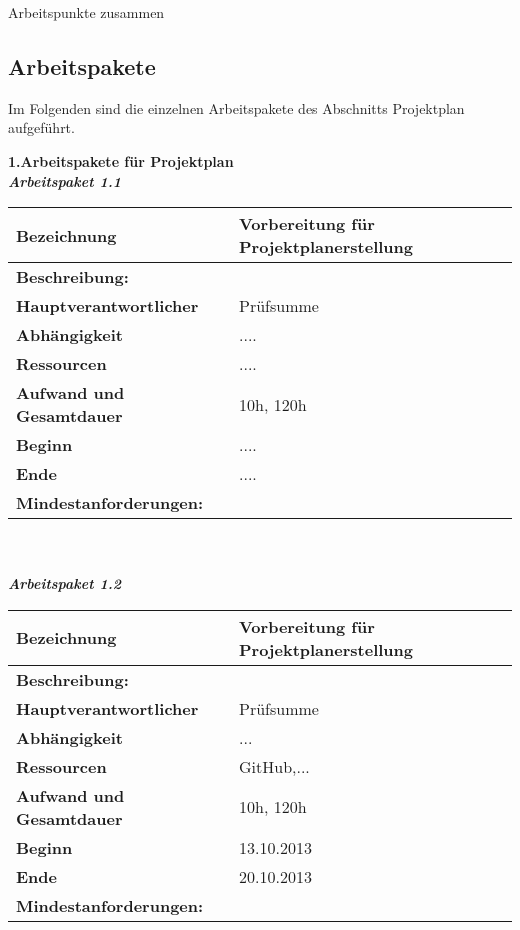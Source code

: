 \documentclass[fontsize=12pt,paper=a4,twoside]{scrartcl}
\begin{document}
Arbeitspunkte zusammen

\subsection{Arbeitspakete}\label{aps}

Im Folgenden sind die einzelnen Arbeitspakete des Abschnitts Projektplan aufgeführt.

\textbf{1.Arbeitspakete für Projektplan} \\
\textit{\textbf{Arbeitspaket 1.1}} \\
\begin{tabular}{|p{7.5cm}|p{7.5cm}|}
\hline
\textbf{Bezeichnung} & Vorbereitung für Projektplanerstellung\\\hline
\multicolumn{2}{|p{15cm}|}{\textbf{Beschreibung: }}  \\\hline
\textbf{Hauptverantwortlicher} & Prüfsumme\\\hline
\textbf{Abhängigkeit} & ....\\\hline
\textbf{Ressourcen} & ....\\\hline
\textbf{Aufwand und Gesamtdauer} & 10h, 120h\\\hline
\textbf{Beginn} &.... \\\hline
\textbf{Ende} & ....\\\hline
\multicolumn{2}{|p{15cm}|}{\textbf{Mindestanforderungen: }}  \\\hline
\end{tabular} \\\\

\textit{\textbf{Arbeitspaket 1.2}} \\
\begin{tabular}{|p{7.5cm}|p{7.5cm}|}
\hline
\textbf{Bezeichnung} & Vorbereitung für Projektplanerstellung\\\hline
\multicolumn{2}{|p{15cm}|}{\textbf{Beschreibung: }}  \\\hline
\textbf{Hauptverantwortlicher} & Prüfsumme\\\hline
\textbf{Abhängigkeit} & ...\\\hline
\textbf{Ressourcen} & GitHub,...\\\hline
\textbf{Aufwand und Gesamtdauer} & 10h, 120h\\\hline
\textbf{Beginn} & 13.10.2013\\\hline
\textbf{Ende} & 20.10.2013\\\hline
\multicolumn{2}{|p{15cm}|}{\textbf{Mindestanforderungen: }}  \\\hline
\end{tabular} \\\\
\end{document}
